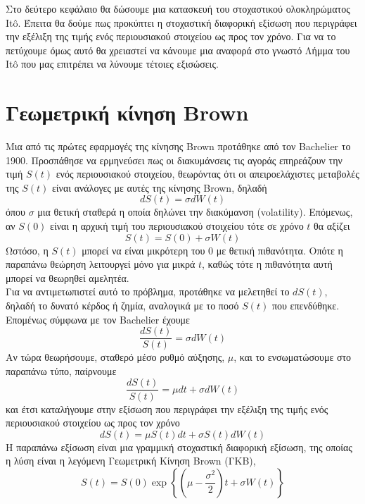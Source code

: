 \documentclass[12pt,a4paper,twoside,openany]{book}
\begin{document}
	Στο δεύτερο κεφάλαιο θα δώσουμε μια κατασκευή του στοχαστικού ολοκληρώματος Itô. Έπειτα θα δούμε πως προκύπτει η στοχαστική διαφορική εξίσωση που περιγράφει την εξέλιξη της τιμής ενός περιουσιακού στοιχείου ως προς τον χρόνο. Για να το πετύχουμε όμως αυτό θα χρειαστεί να κάνουμε μια αναφορά στο γνωστό Λήμμα του Itô που μας επιτρέπει να λύνουμε τέτοιες εξισώσεις.
	
\section{Γεωμετρική κίνηση Brown}
	\vspace{2.5mm}
	Μια από τις πρώτες εφαρμογές της κίνησης Brown προτάθηκε από τον Bachelier το 1900. Προσπάθησε να ερμηνεύσει πως οι διακυμάνσεις τις αγοράς επηρεάζουν την τιμή $S(t)$ ενός περιουσιακού στοιχείου, θεωρόντας ότι οι απειροελάχιστες μεταβολές της $S(t)$ είναι ανάλογες με αυτές της κίνησης Brown, δηλαδή 
	\[dS(t)= \sigma dW(t)\]
	όπου $\sigma$ μια θετική σταθερά η οποία δηλώνει την διακύμανση (volatility). Επόμενως, αν $S(0)$ είναι η αρχική τιμή του περιουσιακού στοιχείου τότε σε χρόνο $t$ θα αξίζει
	\[S(t)=S(0)+\sigma W(t)\]
	Ωστόσο, η $S(t)$ μπορεί να είναι μικρότερη του 0 με θετική πιθανότητα. Οπότε η παραπάνω θεώρηση λειτουργεί μόνο για μικρά $t$, καθώς τότε η πιθανότητα αυτή μπορεί να θεωρηθεί αμελητέα. \\
	Για να αντιμετωπιστεί αυτό το πρόβλημα, προτάθηκε να μελετηθεί το $dS(t)$, δηλαδή το δυνατό κέρδος ή ζημία, αναλογικά με το ποσό $S(t)$ που επενδύθηκε. Επομένως σύμφωνα με τον Bachelier έχουμε
	\[\frac{dS(t)}{S(t)}= \sigma dW(t)\]
	Αν τώρα θεωρήσουμε, σταθερό μέσο ρυθμό αύξησης, $\mu$, και το ενσωματώσουμε στο παραπάνω τύπο, παίρνουμε
	\[\frac{dS(t)}{S(t)}= \mu dt + \sigma dW(t)\]
	και έτσι καταλήγουμε στην εξίσωση που περιγράφει την εξέλιξη της τιμής ενός περιουσιακού στοιχείου ως προς τον χρόνο
	\[dS(t)= \mu S(t)dt + \sigma S(t)dW(t) \label{GBMDiffEq}\tag{2.1.1}\]
	Η παραπάνω εξίσωση είναι μια γραμμική στοχαστική διαφορική εξίσωση, της οποίας η λύση είναι η λεγόμενη Γεωμετρική Κίνηση Brown  (ΓΚΒ), 
	\[S(t)= S(0)\exp\left\{\left(\mu-\frac{\sigma^2}{2}\right)t +\sigma W(t)\right\}\]
\end{document}

